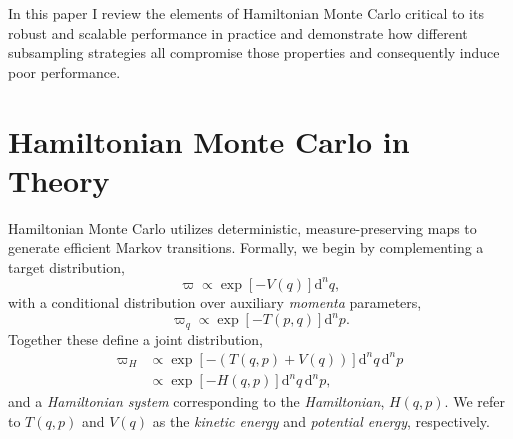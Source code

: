 \documentclass{article}
\begin{document}
In this paper I review the elements of Hamiltonian Monte Carlo critical to its
robust and scalable performance in practice and demonstrate how different 
subsampling strategies all compromise those properties and consequently 
induce poor performance. 

\section{Hamiltonian Monte Carlo in Theory}

Hamiltonian Monte Carlo utilizes deterministic, measure-preserving maps to 
generate efficient Markov transitions.  Formally, we begin by complementing 
a target distribution,
%
\begin{equation*}
\varpi \propto \exp \! \left[ - V ( q ) \right] \mathrm{d}^{n} q,
\end{equation*}
%
with a conditional distribution over auxiliary \textit{momenta} parameters,
%
\begin{equation*}
\varpi_{q} \propto \exp \! \left[ - T (p, q) \right] \mathrm{d}^{n} p.
\end{equation*}
%
Together these define a joint distribution,
%
\begin{align*}
\varpi_{H} 
&\propto \exp \! \left[ - \left( T (q, p) + V (q) \right) \right] \mathrm{d}^{n} q \, \mathrm{d}^{n} p
\\
&\propto \exp \! \left[ - H (q, p) \right] \mathrm{d}^{n} q \, \mathrm{d}^{n} p,
\end{align*}
%
and a \textit{Hamiltonian system} corresponding to the \textit{Hamiltonian},
$ H (q, p) $.  We refer to $T (q, p)$ and $V (q)$ as the \textit{kinetic energy} 
and \textit{potential energy}, respectively.
\end{document}
